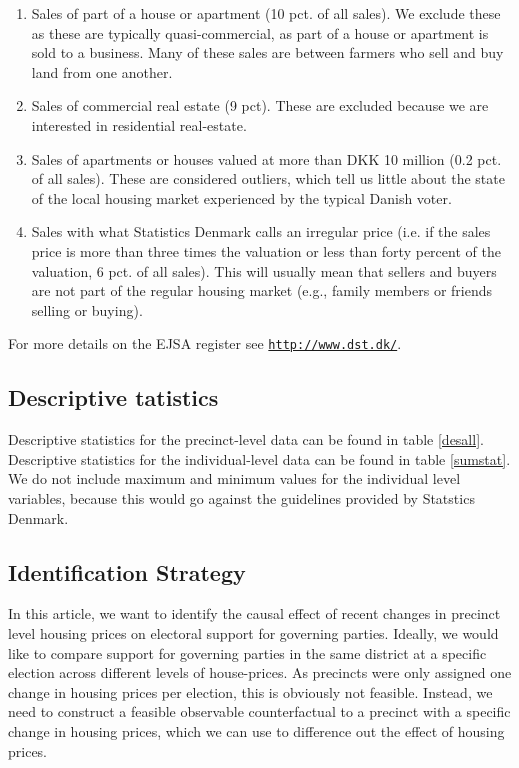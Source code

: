 \documentclass[12pt,a4paper]{article}
\begin{document}
	\begin{enumerate}
		\item Sales of part of a house or apartment (10 pct. of all sales). We exclude these as these are typically quasi-commercial, as part of a house or apartment is sold to a business. Many of these sales are between farmers who sell and buy land from one another.
		\item Sales of commercial real estate (9 pct). These are excluded because we are interested in residential real-estate.
		\item Sales of apartments or houses valued at more than DKK 10 million (0.2 pct. of all sales). These are considered outliers, which tell us little about the state of the local housing market experienced by the typical Danish voter.
		\item Sales with what Statistics Denmark calls an irregular price (i.e. if the sales price is more than three times the valuation or less than forty percent of the valuation, 6 pct. of all sales). This will usually mean that sellers and buyers are not part of the regular housing market (e.g., family members or friends selling or buying).
	\end{enumerate}
	
	For more details on the EJSA register see \texttt{\href{http://www.dst.dk/extranet/ForskningVariabellister/EJSA\%20-\%20Ejendomme\%20salgsoplysninger.html}{http://www.dst.dk/}}.

	\newpage		
			\subsection{Descriptive tatistics}
			\setcounter{table}{0}
			
			Descriptive statistics for the precinct-level data can be found in table \ref{desall}. Descriptive statistics for the individual-level data can be found in table \ref{sumstat}. We do not include maximum and minimum values for the individual level variables, because this would go against the guidelines provided by Statstics Denmark.
			
			
			
			
			
			\newpage
			
			\subsection{Identification Strategy}
			
			In this article, we want to identify the causal effect of recent changes in precinct level housing prices on electoral support for governing parties. Ideally, we would like to compare support for governing parties in the same district at a specific election across different levels of house-prices. As precincts were only assigned one change in housing prices per election, this is obviously not feasible. Instead, we need to construct a feasible observable counterfactual to a precinct with a specific change in housing prices, which we can use to difference out the effect of housing prices.
			
\end{document}
